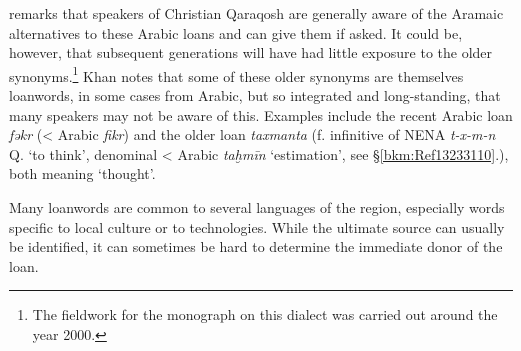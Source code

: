 \documentclass[output=paper]{langsci/langscibook}
\begin{document}
\citet[516]{Khan2002} remarks that speakers of Christian Qaraqosh are generally aware of the Aramaic alternatives to these Arabic loans and can give them if asked. It could be, however, that subsequent generations will have had little exposure to the older synonyms.\footnote{The fieldwork for the monograph on this dialect was carried out around the year 2000.} Khan notes that some of these older synonyms are themselves loanwords, in some cases from Arabic, but so integrated and long-standing, that many speakers may not be aware of this. Examples include the recent Arabic loan \textit{fəkr} (< Arabic \textit{fikr}) and the older loan \textit{taxmanta} (f. infinitive of NENA \textit{t\nobreakdash-x\nobreakdash-m\nobreakdash-n} Q. ‘to think’, denominal < Arabic \textit{taḫmīn} ‘estimation’, see §\ref{bkm:Ref13233110}.), both meaning ‘thought’.

Many loanwords are common to several languages of the region, especially words specific to local culture or to technologies. While the ultimate source can usually be identified, it can sometimes be hard to determine the immediate donor of the loan. 
\end{document}
